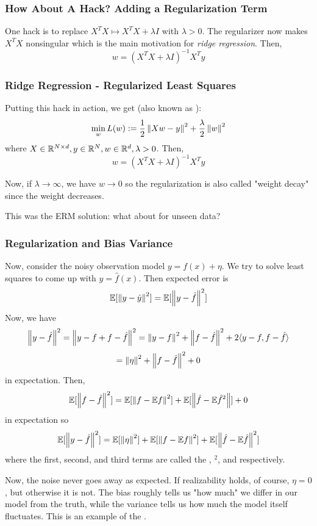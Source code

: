 \documentclass[11pt]{scrartcl}
\begin{document}
\subsubsection{How About A Hack? Adding a Regularization Term}
One hack is to replace $X^{T}X \mapsto X^{T}X+\lambda{I}$ with $\lambda>0$. The regularizer now makes $X^{T}X$ nonsingular which is the main motivation for \textit{ridge regression}. Then, $$w=(X^{T}X+\lambda{I})^{-1}X^{T}y$$

\subsubsection{Ridge Regression - Regularized Least Squares}
 Putting this hack in action, we get  (also known as ):
 $$\min_{w}L(w) := \frac{1}{2}\left\lVert Xw-y\right\rVert^2+\frac{\lambda}{2}\left\lVert w\right\rVert^2$$
 where $X \in \mathbb{R}^{N \times d}, y \in \mathbb{R}^N, w \in \mathbb{R}^d, \lambda >0$. Then, $$w=(X^{T}X+\lambda{I})^{-1}X^{T}y$$
 
 Now, if $\lambda \to \infty$, we have $w \to 0$ so the regularization is also called "weight decay" since the weight decreases. 
 
 This was the ERM solution: what about for unseen data?

\subsubsection{Regularization and Bias Variance}
Now, consider the noisy observation model $y=f(x)+\eta$. We try to solve least squares to come up with $\hat{y}=\hat{f}(x)$. Then expected error is $$\mathbb{E}[\left\lVert y-\hat{y}\right\rVert^2]=\mathbb{E}[\left\lVert y-\hat{f}\right\rVert^2]$$
Now, we have 
$$\left\lVert y-\hat{f}\right\rVert^2=\left\lVert y-f+f-\hat{f}\right\rVert^2=\left\lVert y-f\right\rVert^2+\left\lVert f-\hat{f}\right\rVert^2+2\langle y-f, f-\hat{f} \rangle$$
$$=\left\lVert\eta\right\rVert^2+\left\lVert f-\hat{f}\right\rVert^2+0$$ in expectation. 
Then, $$\mathbb{E}[\left\lVert f-\hat{f}\right\rVert^2]=\mathbb{E}[\left\lVert f-\mathbb{E}{f}\right\rVert^2]+\mathbb{E}[\left\lVert\hat{f}-\mathbb{E}\hat{f}^2\right\rVert]+0$$ in expectation so 
$$\mathbb{E}[\left\lVert y-\hat{f}\right\rVert^2]=\mathbb{E}[\left\lVert\eta\right\rVert^2]+\mathbb{E}[\left\lVert f-\mathbb{E}{f}\right\rVert^2]+\mathbb{E}[\left\lVert\hat{f}-\mathbb{E}{\hat{f}}\right\rVert^2]$$
where the first, second, and third terms are called the , $^2$, and  respectively.

Now, the noise never goes away as expected. If realizability holds, of course, $\eta=0$, but otherwise it is not. The bias roughly tells us "how much" we differ in our model from the truth, while the variance tells us how much the model itself fluctuates. This is an example of the .
\end{document}
